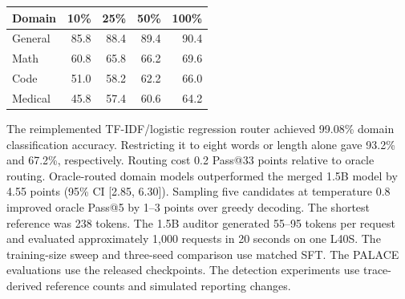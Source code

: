 \documentclass[11pt]{article}
\begin{document}
\begin{center}
\begin{minipage}{\linewidth}
\centering
{}\label{tab:supp-training-size}
\small
\begin{tabular}{lrrrr}
\toprule
Domain & 10\% & 25\% & 50\% & 100\%\\
\midrule
General &85.8&88.4&89.4&90.4\\
Math &60.8&65.8&66.2&69.6\\
Code &51.0&58.2&62.2&66.0\\
Medical &45.8&57.4&60.6&64.2\\
\bottomrule
\end{tabular}
\end{minipage}
\end{center}
The reimplemented TF-IDF/logistic regression router achieved 99.08\% domain classification accuracy. Restricting it to eight words or length alone gave 93.2\% and 67.2\%, respectively. Routing cost 0.2 Pass@33 points relative to oracle routing. Oracle-routed domain models outperformed the merged 1.5B model by 4.55 points (95\% CI [2.85, 6.30]). Sampling five candidates at temperature 0.8 improved oracle Pass@5 by 1--3 points over greedy decoding. The shortest reference was 238 tokens. The 1.5B auditor generated 55--95 tokens per request and evaluated approximately 1,000 requests in 20 seconds on one L40S. The training-size sweep and three-seed comparison use matched SFT. The PALACE evaluations use the released checkpoints. The detection experiments use trace-derived reference counts and simulated reporting changes.
\end{document}
